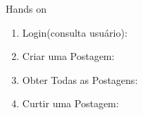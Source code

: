 \documentclass{if-beamer}
\begin{document}
\begin{frame}{Hands on}
\begin{overlayarea}{\textwidth}{\textheight}
{\begin{enumerate}
				\item Login(consulta usuário):
				
				
				\item Criar uma Postagem:
				
				
				\item Obter Todas as Postagens:
				
				
				\item Curtir uma Postagem:
				
			\end{enumerate}
		}
	\end{overlayarea}
	
\end{frame}
\end{document}

